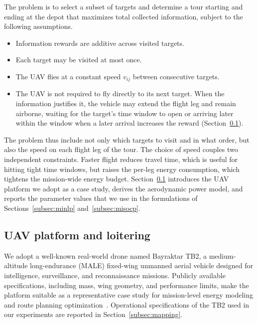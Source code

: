 \documentclass[11pt]{article}
\let\originalsubsection\subsection
\renewcommand{\subsection}{\FloatBarrier\originalsubsection}
\begin{document}
The problem is to select a subset of targets and determine a tour starting and ending at the depot that maximizes total collected information, subject to the following assumptions.
\begin{itemize}
\item Information rewards are additive across visited targets.
\item Each target may be visited at most once.
\item The UAV flies at a constant speed $v_{ij}$ between consecutive targets.
\item The UAV is not required to fly directly to its next target. When the information justifies it, the vehicle may extend the flight leg and remain airborne, waiting for the target's time window to open or arriving later within the window when a later arrival increases the reward (Section~\ref{subsec:uav}).
\end{itemize}

The problem thus include not only which targets to visit and in what order, but also the speed on each flight leg of the tour. The choice of speed couples two independent constraints. Faster flight reduces travel time, which is useful for hitting tight time windows, but raises the per-leg energy consumption, which tightens the mission-wide energy budget. Section~\ref{subsec:uav} introduces the UAV platform we adopt as a case study, derives the aerodynamic power model, and reports the parameter values that we use in the formulations of Sections~\ref{subsec:minlp} and~\ref{subsec:misocp}.



\subsection{UAV platform and loitering}\label{subsec:uav}


We adopt a well-known real-world drone named Bayraktar TB2, a medium-altitude long-endurance (MALE) fixed-wing unmanned aerial vehicle designed for intelligence, surveillance, and reconnaissance missions. Publicly available specifications, including mass, wing geometry, and performance limits, make the platform suitable as a representative case study for mission-level energy modeling and route planning optimization~\cite{baykar_tb2}. Operational specifications of the TB2 used in our experiments are reported in Section~\ref{subsec:mapping}. 
\end{document}

